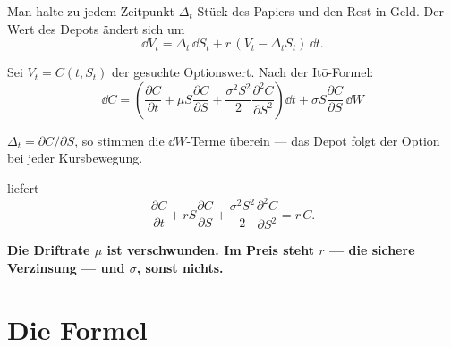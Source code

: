 \begin{merksatz}
Man halte zu jedem Zeitpunkt $\Delta_t$ Stück des Papiers und den Rest in Geld. Der Wert des Depots ändert sich um
\[ \dd V_t = \Delta_t\,\dd S_t + r\,(V_t - \Delta_t S_t)\,\dd t . \]

Sei $V_t = C(t,S_t)$ der gesuchte Optionswert. Nach der Itō-Formel:
\[ \dd C = \left(\frac{\partial C}{\partial t} + \mu S\frac{\partial C}{\partial S} + \frac{\sigma^{2}S^{2}}{2}\frac{\partial^{2}C}{\partial S^{2}}\right)\dd t + \sigma S\frac{\partial C}{\partial S}\,\dd W \]

 $\Delta_t = \partial C/\partial S$, so stimmen die $\dd W$-Terme überein --- das Depot folgt der Option bei jeder Kursbewegung.

 liefert
\[ \frac{\partial C}{\partial t} + r S\frac{\partial C}{\partial S} + \frac{\sigma^{2}S^{2}}{2}\frac{\partial^{2}C}{\partial S^{2}} = r\,C . \]

\begin{center}
\begin{minipage}{0.9\textwidth}
\textbf{Die Driftrate $\mu$ ist verschwunden. Im Preis steht $r$ --- die sichere Verzinsung --- und $\sigma$, sonst nichts.}
\end{minipage}
\end{center}

\begin{center}
\begin{minipage}{0.88\textwidth}
\end{minipage}
\end{center}
\end{merksatz}

\section{Die Formel}


